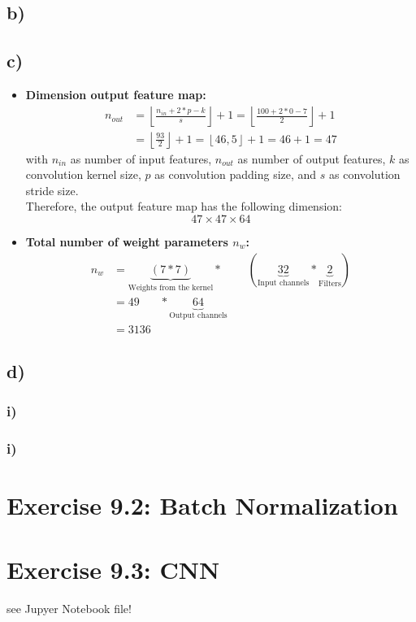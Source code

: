 \documentclass[a4paper]{article}
\begin{document}
    \subsection*{b)}
        

    \subsection*{c)}
        \begin{itemize}
            \item \textbf{Dimension output feature map:}\\
                \begin{align}
                    n_{out} &= \left\lfloor \frac{n_{in} + 2*p - k}{s} \right\rfloor + 1
                    = \left\lfloor \frac{100 + 2*0 - 7}{2} \right\rfloor + 1\\
                    &= \left\lfloor \frac{93}{2} \right\rfloor + 1
                    = \left\lfloor 46,5 \right\rfloor + 1 = 46 + 1 = 47
                \end{align}
                with $n_{in}$ as number of input features, $n_{out}$ as number of output features, $k$ as convolution kernel size, 
                $p$ as convolution padding size, and $s$ as convolution stride size.\\
                Therefore, the output feature map has the following dimension:
                $$47 \times 47 \times 64$$
            
            \item \textbf{Total number of weight parameters $n_w$:}\\
                \begin{align}
                    n_w &= \underbrace{(7 * 7)}_{\text{Weights from the kernel}} *\ \ \ \ \ \ \ \ \ \  (\underbrace{32}_{\text{Input channels}} * \underbrace{2}_{\text{Filters}})\\ 
                    &= 49\ \ \ \ \ \ \ \  * \underbrace{64}_{\text{Output channels}}\\ 
                    &= 3136
                \end{align}

        \end{itemize}

    \subsection*{d)}
        \subsubsection*{i)}
            

        \subsubsection*{i)}
            



\newpage
\section*{Exercise 9.2: Batch Normalization}
    




\newpage
\section*{Exercise 9.3: CNN}
    see Jupyer Notebook file!
\end{document}
